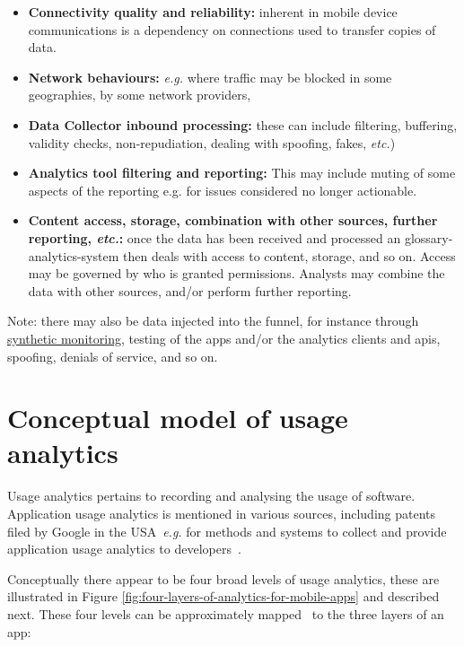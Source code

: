 \begin{itemize}
    \item \textbf{Connectivity quality and reliability:} inherent in mobile device communications is a dependency on connections used to transfer copies of data. 
    \item \textbf{Network behaviours:} \emph{e.g.} where traffic may be blocked in some geographies, by some network providers, %
    \item \textbf{Data Collector inbound processing:} these can include filtering, buffering, validity checks, non-repudiation, dealing with spoofing, fakes, \emph{etc.})
    \item \textbf{Analytics tool filtering and reporting:} This may include muting of some aspects of the reporting e.g. for issues considered no longer actionable. 
    \item \textbf{Content access, storage, combination with other sources, further reporting, \emph{etc.}:} once the data has been received and processed an \gls{glossary-analytics-system} then deals with access to content, storage, and so on. Access may be governed by who is granted permissions. Analysts may combine the data with other sources, and/or perform further reporting.
\end{itemize}

Note: there may also be data injected into the funnel, for instance through \href{https://en.wikipedia.org/wiki/Synthetic_monitoring}{synthetic monitoring}, testing of the apps and/or the analytics clients and \Glspl{api}, spoofing, denials of service, and so on. 





\section{Conceptual model of usage analytics}
Usage analytics pertains to recording and analysing the usage of software. Application usage analytics is mentioned in various sources, including patents filed by Google in the USA~\emph{e.g.} for methods and systems to collect and provide application usage analytics to developers~. 

Conceptually there appear to be four broad levels of usage analytics, these are illustrated in Figure \ref{fig:four-layers-of-analytics-for-mobile-apps} and described next. These four levels can be approximately mapped~ to the three layers of an app:

